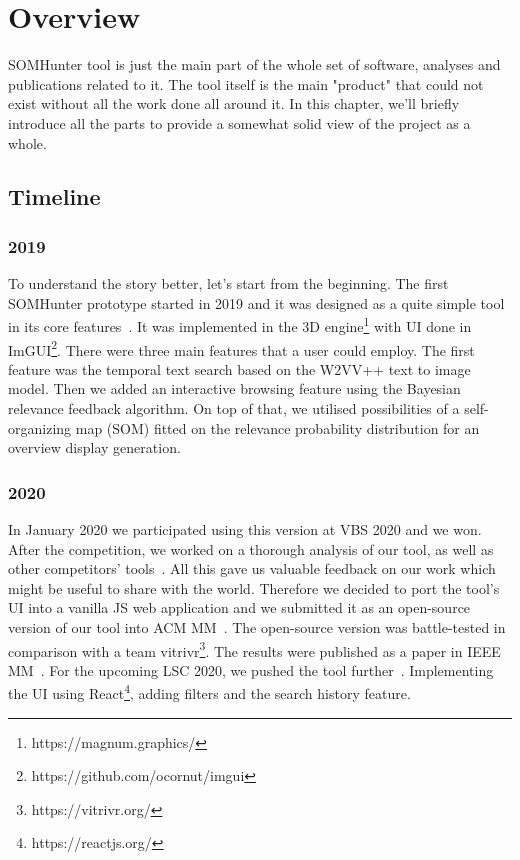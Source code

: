\chapter{Overview}
\label{overview}

SOMHunter tool is just the main part of the whole set of software, analyses and publications related to it. The tool itself is the main "product" that could not exist without all the work done all around it. In this chapter, we'll briefly introduce all the parts to provide a somewhat solid view of the project as a whole.

\section{Timeline}

\subsection{2019}
To understand the story better, let's start from the beginning. The first SOMHunter prototype started in 2019 and it was designed as a quite simple tool in its core features~\cite{kratochvil2020som}. It was implemented in the 3D engine\footnote{https://magnum.graphics/} with UI done in ImGUI\footnote{https://github.com/ocornut/imgui}. There were three main features that a user could employ. The first feature was the temporal text search based on the W2VV++ text to image model. Then we added an interactive browsing feature using the Bayesian relevance feedback algorithm. On top of that, we utilised possibilities of a self-organizing map (SOM) fitted on the relevance probability distribution for an overview display generation. 

\subsection{2020}
In January 2020 we participated using this version at VBS 2020 and we won. After the competition, we worked on a thorough analysis of our tool, as well as other competitors' tools~\cite{lokovc2021reign}. All this gave us valuable feedback on our work which might be useful to share with the world. Therefore we decided to port the tool's UI into a vanilla JS web application and we submitted it as an open-source version of our tool into ACM MM~\cite{kratochvil2020somhunter}. The open-source version was battle-tested in comparison with a team vitrivr\footnote{https://vitrivr.org/}. The results were published as a paper in IEEE MM~\cite{rosetto2021}. For the upcoming LSC 2020, we pushed the tool further~\cite{mejzlik2020somhunter}. Implementing the UI using React\footnote{https://reactjs.org/}, adding filters and the search history feature.


